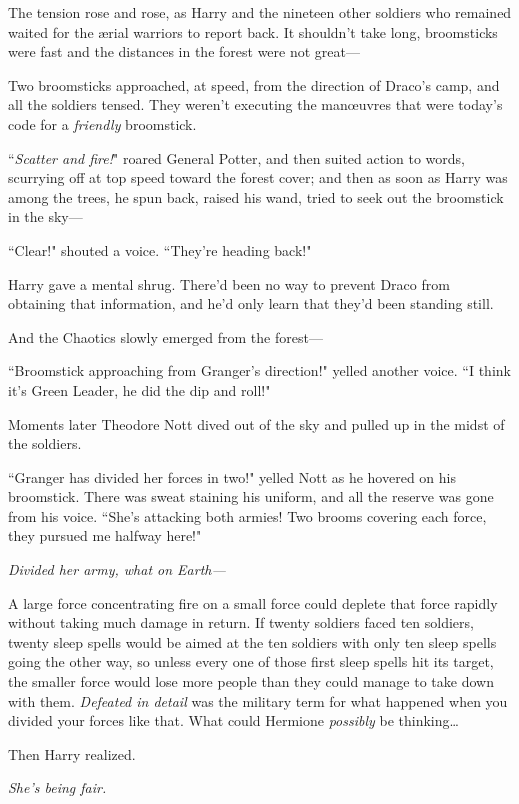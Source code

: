 \later

The tension rose and rose, as Harry and the nineteen other soldiers who remained waited for the ærial warriors to report back. It shouldn't take long, broomsticks were fast and the distances in the forest were not great—

Two broomsticks approached, at speed, from the direction of Draco's camp, and all the soldiers tensed. They weren't executing the manœuvres that were today's code for a \emph{friendly} broomstick.

``\emph{Scatter and fire!}" roared General Potter, and then suited action to words, scurrying off at top speed toward the forest cover; and then as soon as Harry was among the trees, he spun back, raised his wand, tried to seek out the broomstick in the sky—

``Clear!" shouted a voice. ``They're heading back!"

Harry gave a mental shrug. There'd been no way to prevent Draco from obtaining that information, and he'd only learn that they'd been standing still.

And the Chaotics slowly emerged from the forest—

``Broomstick approaching from Granger's direction!" yelled another voice. ``I think it's Green Leader, he did the dip and roll!"

Moments later Theodore Nott dived out of the sky and pulled up in the midst of the soldiers.

``Granger has divided her forces in two!" yelled Nott as he hovered on his broomstick. There was sweat staining his uniform, and all the reserve was gone from his voice. ``She's attacking both armies! Two brooms covering each force, they pursued me halfway here!"

\emph{Divided her army, what on Earth—}

A large force concentrating fire on a small force could deplete that force rapidly without taking much damage in return. If twenty soldiers faced ten soldiers, twenty sleep spells would be aimed at the ten soldiers with only ten sleep spells going the other way, so unless every one of those first sleep spells hit its target, the smaller force would lose more people than they could manage to take down with them. \emph{Defeated in detail} was the military term for what happened when you divided your forces like that. What could Hermione \emph{possibly} be thinking{\ldots}

Then Harry realized.

\emph{She's being fair.}

